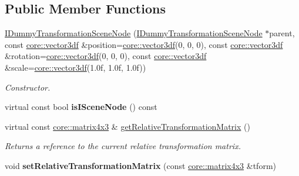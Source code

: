 \subsection*{Public Member Functions}
\begin{DoxyCompactItemize}
\item 
\hyperlink{classirr_1_1scene_1_1IDummyTransformationSceneNode_ae5af13edb138640195e48d8f5811fe79}{I\+Dummy\+Transformation\+Scene\+Node} (\hyperlink{classirr_1_1scene_1_1IDummyTransformationSceneNode}{I\+Dummy\+Transformation\+Scene\+Node} $\ast$parent, const \hyperlink{namespaceirr_1_1core_a06f169d08b5c429f5575acb7edbad811}{core\+::vector3df} \&position=\hyperlink{namespaceirr_1_1core_a06f169d08b5c429f5575acb7edbad811}{core\+::vector3df}(0, 0, 0), const \hyperlink{namespaceirr_1_1core_a06f169d08b5c429f5575acb7edbad811}{core\+::vector3df} \&rotation=\hyperlink{namespaceirr_1_1core_a06f169d08b5c429f5575acb7edbad811}{core\+::vector3df}(0, 0, 0), const \hyperlink{namespaceirr_1_1core_a06f169d08b5c429f5575acb7edbad811}{core\+::vector3df} \&scale=\hyperlink{namespaceirr_1_1core_a06f169d08b5c429f5575acb7edbad811}{core\+::vector3df}(1.\+0f, 1.\+0f, 1.\+0f))\hypertarget{classirr_1_1scene_1_1IDummyTransformationSceneNode_ae5af13edb138640195e48d8f5811fe79}{}\label{classirr_1_1scene_1_1IDummyTransformationSceneNode_ae5af13edb138640195e48d8f5811fe79}

\begin{DoxyCompactList}\small\item\em Constructor. \end{DoxyCompactList}\item 
virtual const bool {\bfseries is\+I\+Scene\+Node} () const \hypertarget{classirr_1_1scene_1_1IDummyTransformationSceneNode_aafeae403a5f9689fce5e371b7ded2027}{}\label{classirr_1_1scene_1_1IDummyTransformationSceneNode_aafeae403a5f9689fce5e371b7ded2027}

\item 
virtual const \hyperlink{classirr_1_1core_1_1matrix4x3}{core\+::matrix4x3} \& \hyperlink{classirr_1_1scene_1_1IDummyTransformationSceneNode_aeda15f68e3b6c7ee44b6fcc9709cecec}{get\+Relative\+Transformation\+Matrix} ()
\begin{DoxyCompactList}\small\item\em Returns a reference to the current relative transformation matrix. \end{DoxyCompactList}\item 
void {\bfseries set\+Relative\+Transformation\+Matrix} (const \hyperlink{classirr_1_1core_1_1matrix4x3}{core\+::matrix4x3} \&tform)\hypertarget{classirr_1_1scene_1_1IDummyTransformationSceneNode_a39d0ba78cf93d8a9052f9cc015bed6a4}{}\label{classirr_1_1scene_1_1IDummyTransformationSceneNode_a39d0ba78cf93d8a9052f9cc015bed6a4}


\end{DoxyCompactItemize}
